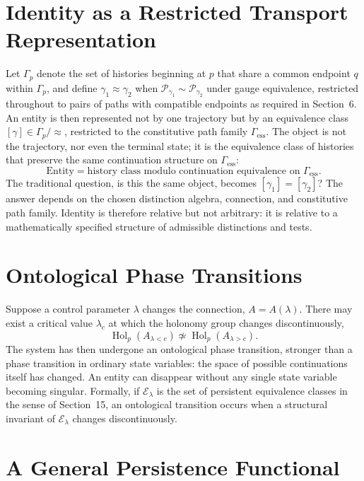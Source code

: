 \documentclass[11pt]{article}
\newcommand{\Hol}{\operatorname{Hol}}
\begin{document}
\section{Identity as a Restricted Transport Representation}

Let $\Gamma_p$ denote the set of histories beginning at $p$ that share a common endpoint $q$ within $\Gamma_p$, and define $\gamma_1 \approx \gamma_2$ when $\mathcal{P}_{\gamma_1} \sim \mathcal{P}_{\gamma_2}$ under gauge equivalence, restricted throughout to pairs of paths with compatible endpoints as required in Section~6. An entity is then represented not by one trajectory but by an equivalence class $[\gamma] \in \Gamma_p / {\approx}$, restricted to the constitutive path family $\Gamma_{\mathrm{ess}}$. The object is not the trajectory, nor even the terminal state; it is the equivalence class of histories that preserve the same continuation structure on $\Gamma_{\mathrm{ess}}$:
\[
\text{Entity} = \text{history class modulo continuation equivalence on } \Gamma_{\mathrm{ess}}.
\]
The traditional question, is this the same object, becomes $[\gamma_1] = [\gamma_2]$? The answer depends on the chosen distinction algebra, connection, and constitutive path family. Identity is therefore relative but not arbitrary: it is relative to a mathematically specified structure of admissible distinctions and tests.

\section{Ontological Phase Transitions}

Suppose a control parameter $\lambda$ changes the connection, $A = A(\lambda)$. There may exist a critical value $\lambda_c$ at which the holonomy group changes discontinuously,
\[
\Hol_p(A_{\lambda < c}) \not\simeq \Hol_p(A_{\lambda > c}).
\]
The system has then undergone an ontological phase transition, stronger than a phase transition in ordinary state variables: the space of possible continuations itself has changed. An entity can disappear without any single state variable becoming singular. Formally, if $\mathcal{E}_\lambda$ is the set of persistent equivalence classes in the sense of Section~15, an ontological transition occurs when a structural invariant of $\mathcal{E}_\lambda$ changes discontinuously.

\section{A General Persistence Functional}
\end{document}

